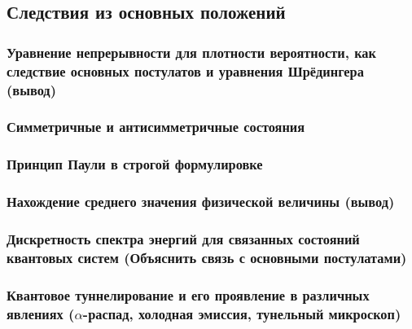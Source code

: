 \subsection{Следствия из основных положений}

\subsubsection{Уравнение непрерывности для плотности вероятности, как следствие основных постулатов и уравнения Шрёдингера (вывод)}

\subsubsection{Симметричные и антисимметричные состояния}

\subsubsection{Принцип Паули в строгой формулировке}

\subsubsection{Нахождение среднего значения физической величины (вывод)}

\subsubsection{Дискретность спектра энергий для связанных состояний квантовых систем (Объяснить связь с основными постулатами)}

\subsubsection{Квантовое туннелирование и его проявление в различных явлениях ($\alpha$-распад, холодная эмиссия, тунельный микроскоп)}



